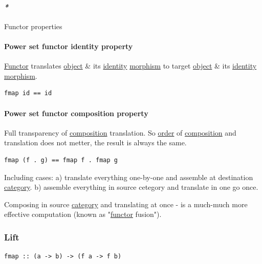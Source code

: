 \documentclass[a4paper,14pt,oneside]{book}
\begin{document}
\paragraph{\emph{*}}
\label{sec:org1d9b26a}

\label{org6068611}Functor properties

\paragraph{\label{orge670bc7}Power set functor identity property}
\label{sec:orge3c31af}
\hyperref[org878310f]{Functor} translates \hyperref[orgfa5870c]{object} \& its \hyperref[org70f87e4]{identity} \hyperref[org745ec04]{morphism} to target \hyperref[orgfa5870c]{object} \& its \hyperref[org70f87e4]{identity} \hyperref[org745ec04]{morphism}.

\begin{verbatim}
fmap id == id
\end{verbatim}


\paragraph{\label{org253cb59}Power set functor composition property}
\label{sec:org7b7a990}
Full transparency of \hyperref[org2721976]{composition} translation.
So \hyperref[org78e21db]{order} of \hyperref[org2721976]{composition} and translation does not metter, the result is always the same.

\begin{verbatim}
fmap (f . g) == fmap f . fmap g
\end{verbatim}

Including cases:
  a) translate everything one-by-one and assemble at destination \hyperref[org77f032a]{category}.
  b) assemble everything in source cetegory and translate in one go once.

Composing in source \hyperref[org77f032a]{category} and translating at once - is a much-much more effective computation (known as "\hyperref[org878310f]{functor} \label{orgc949dc0}fusion").

\subsubsection{\label{org7d3a14c}Lift}
\label{sec:orga9c7668}
\begin{verbatim}
fmap :: (a -> b) -> (f a -> f b)
\end{verbatim}
\end{document}
